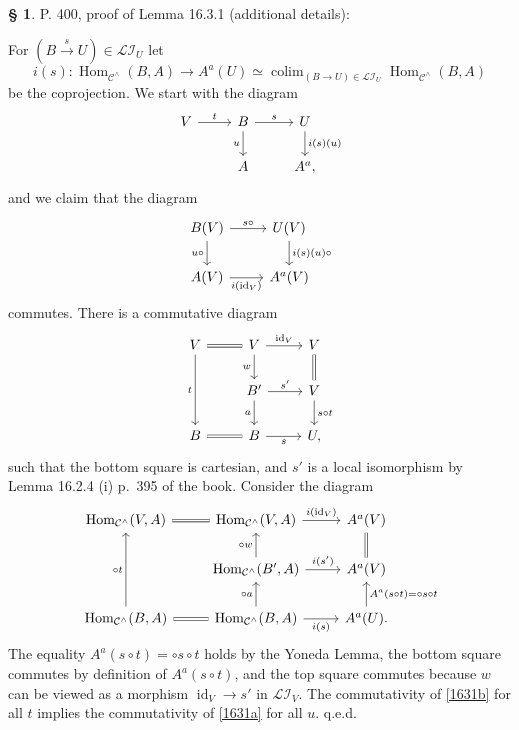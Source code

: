 \documentclass[12pt]{article}%
\theoremstyle{remark}
\theoremstyle{definition}
\newtheorem{s}[thm]{\S}%
\newcommand{\cc}{\mathcal}
\newcommand{\mc}{\mathcal}
\newcommand{\C}{\mathcal C}
\newcommand{\xr}{\xrightarrow}
\DeclareMathOperator*{\colim}{colim}
\DeclareMathOperator{\id}{id}
\DeclareMathOperator{\Hom}{Hom}%
\begin{document}
%

\begin{s} 
P. 400, proof of Lemma 16.3.1 (additional details): 

For $(B\xr s U)\in\mc{LI}_U$ let 
$$
i(s):\Hom_{\C^\wedge}(B,A)\to A^a(U)\simeq\colim_{(B\to U)\in\cc{LI}_U}\Hom_{\C^\wedge}(B,A)
$$ 
be the coprojection. We start with the diagram 
$$
\begin{tikzcd}
%
V\ar{r}{t}&B\ar{d}[swap]{u}\ar{r}{s}&U\ar{d}{i(s)(u)}\\ 
{}&A&A^a,
%
\end{tikzcd}
$$ 
and we claim that the diagram 
\begin{equation}\label{1631a}
\begin{tikzcd}
%
B(V)\ar{d}[swap]{u\circ}\ar{r}{s\circ}&U(V)\ar{d}{i(s)(u)\circ}\\ 
A(V)\ar{r}[swap]{i(\id_V)}&A^a(V)
%
\end{tikzcd}
\end{equation} 
commutes. There is a commutative diagram 
$$
\begin{tikzcd}
%
V\ar{dd}[swap]{t}\ar[equal]{r}&V\ar{d}[swap]{w}\ar{r}{\id_V}&V\ar[equal]{d}\\ 
{}&B'\ar{d}[swap]{a}\ar{r}{s'}&V\ar{d}{s\circ t}\\ 
B\ar[equal]{r}&B\ar{r}[swap]{s}&U,
%
\end{tikzcd}
$$ 
such that the bottom square is cartesian, and $s'$ is a local isomorphism by Lemma 16.2.4 (i) p.~395 of the book. Consider the diagram 
%
\begin{equation}\label{1631b}
\begin{tikzcd}
\Hom_{\C^\wedge}(V,A)\ar[equal]{r}&\Hom_{\C^\wedge}(V,A)\ar{r}{i(\id_V)}&A^a(V)\ar[equal]{d}\\ 
{}&\Hom_{\C^\wedge}(B',A)\ar{u}{\circ w}\ar{r}{i(s')}&A^a(V)\\ 
\Hom_{\C^\wedge}(B,A)\ar{uu}{\circ t}\ar[equal]{r}&\Hom_{\C^\wedge}(B,A)\ar{u}{\circ a}\ar{r}[swap]{i(s)}&A^a(U)\ar{u}[swap]{A^a(s\circ t)=\circ s\circ t}.
\end{tikzcd}
\end{equation}
%
The equality $A^a(s\circ t)=\circ s\circ t$ holds by the Yoneda Lemma, the bottom square commutes by definition of $A^a(s\circ t)$, and the top square commutes because $w$ can be viewed as a morphism $\id_V\to s'$ in $\mc{LI}_V$. The commutativity of \eqref{1631b} for all $t$ implies the commutativity of \eqref{1631a} for all $u$. q.e.d.
\end{s}
\end{document}
